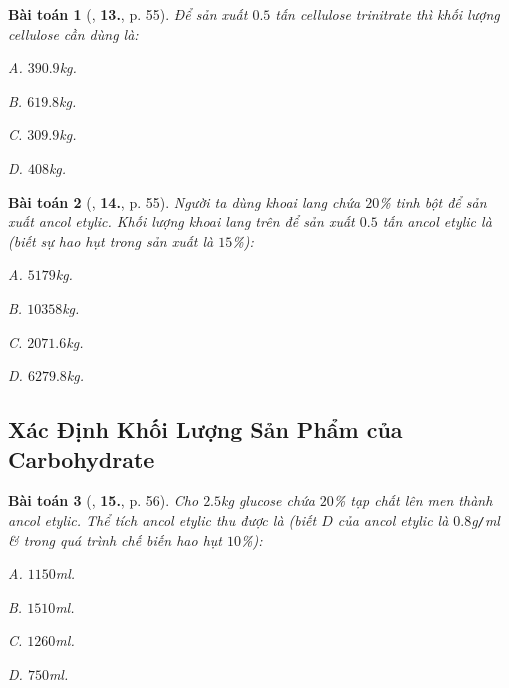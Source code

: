 \documentclass{article}
\numberwithin{equation}{section}
\newtheorem{baitoan}{Bài toán}[section]
\begin{document}
\begin{baitoan}[\cite{An2008}, \textbf{13.}, p. 55]
	Để sản xuất $0.5$ tấn cellulose trinitrate thì khối lượng cellulose cần dùng là:
	\begin{enumerate*}
		\item[{\rm\sf A.}] $390.9$\emph{kg}.
		\item[{\rm\sf B.}] $619.8$\emph{kg}.
		\item[{\rm\sf C.}] $309.9$\emph{kg}.
		\item[{\rm\sf D.}] $408$\emph{kg}.
	\end{enumerate*}
\end{baitoan}

\begin{baitoan}[\cite{An2008}, \textbf{14.}, p. 55]
	Người ta dùng khoai lang chứa $20$\% tinh bột để sản xuất ancol etylic. Khối lượng khoai lang trên để sản xuất $0.5$ tấn ancol etylic là (biết sự hao hụt trong sản xuất là $15$\%):
	\begin{enumerate*}
		\item[{\rm\sf A.}] $5179$\emph{kg}.
		\item[{\rm\sf B.}] $10358$\emph{kg}.
		\item[{\rm\sf C.}] $2071.6$\emph{kg}.
		\item[{\rm\sf D.}] $6279.8$\emph{kg}.
	\end{enumerate*}
\end{baitoan}

\subsection{Xác Định Khối Lượng Sản Phẩm của Carbohydrate}

\begin{baitoan}[\cite{An2008}, \textbf{15.}, p. 56]
	Cho $2.5$\emph{kg} glucose chứa $20$\% tạp chất lên men thành ancol etylic. Thể tích ancol etylic thu được là (biết $D$ của ancol etylic là $0.8$\emph{g\texttt{/}ml} \& trong quá trình chế biến hao hụt $10$\%):
	\begin{enumerate*}
		\item[{\rm\sf A.}] $1150$\emph{ml}.
		\item[{\rm\sf B.}] $1510$\emph{ml}.
		\item[{\rm\sf C.}] $1260$\emph{ml}.
		\item[{\rm\sf D.}] $750$\emph{ml}.
	\end{enumerate*}
\end{baitoan}
\end{document}
